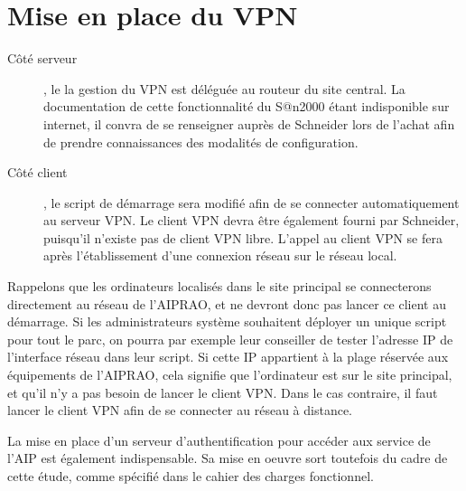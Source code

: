 \section{Mise en place du VPN}

\begin{description}
\item	[Côté serveur], le la gestion du VPN est déléguée au routeur du site central.
La documentation de cette fonctionnalité du S@n2000 étant indisponible sur
internet, il convra de se renseigner auprès de Schneider lors de l'achat afin
de prendre connaissances des modalités de configuration.

\item	[Côté client], le script de démarrage sera modifié afin de se connecter
automatiquement au serveur VPN. Le client VPN devra être également fourni par
Schneider, puisqu'il n'existe pas de client VPN libre. L'appel au client VPN se
fera après l'établissement d'une connexion réseau sur le réseau local.

\end{description}
	Rappelons que les ordinateurs localisés dans le site principal se
connecterons directement au  réseau de l'AIPRAO, et ne devront donc pas lancer
ce client au démarrage. Si les administrateurs système souhaitent déployer un
unique script pour tout le parc, on pourra par exemple leur conseiller de tester
l'adresse IP de l'interface réseau dans leur script. Si cette IP appartient à la
plage réservée aux équipements de l'AIPRAO, cela signifie que l'ordinateur est
sur le site principal, et qu'il n'y a pas besoin de lancer le client VPN. Dans
le cas contraire, il faut lancer le  client VPN afin de se connecter au réseau
à distance.

	La mise en place d'un serveur d'authentification pour accéder aux service de
l'AIP est également indispensable. Sa mise en oeuvre sort toutefois du cadre de
cette étude,  comme spécifié dans le cahier des charges fonctionnel.

